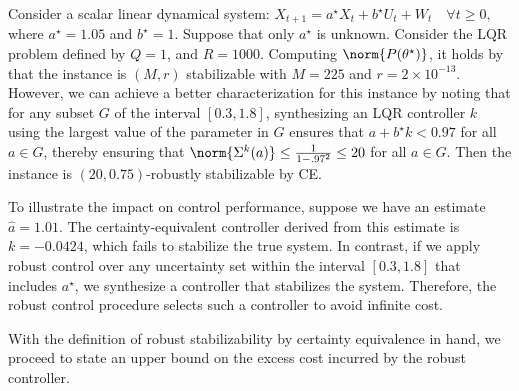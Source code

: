 \begin{example}
    Consider a scalar linear dynamical system:
        $X_{t+1} = a^\star X_t + b^\star U_t + W_t \quad \forall t\geq 0,$
    where $a^\star = 1.05$ and $b^\star = 1$. Suppose that only $a^\star$ is unknown. Consider the LQR problem defined by $Q=1$, and $R=1000$. Computing $\norm{P(\theta^\star)}$, it holds by \citet{simchowitz2020naive} that the instance is $(M, r)$ stabilizable with $M = 225$ and $r = 2\times 10^{-13}$. However, we can achieve a better characterization for this instance by noting that for any subset $G$ of the interval $[0.3, 1.8]$, synthesizing an LQR controller $k$ using the largest value of the parameter in $G$ ensures that $a + b^\star k < 0.97$ for all $a \in G$, thereby ensuring that $\norm{\Sigma^k(a)} \leq \frac{1}{1-.97^2}\leq 20$ for all $a \in G$. Then the instance is $(20, 0.75)$-robustly stabilizable by CE. 

    To illustrate the impact on control performance, suppose we have an estimate $\hat a = 1.01$. The certainty-equivalent controller derived from this estimate is $k=-0.0424$, which fails to stabilize the true system. In contrast, if we apply robust control over any uncertainty set within the interval 
    $[0.3,1.8]$ that includes $a^\star$, we synthesize a controller that stabilizes the system. Therefore, the robust control procedure selects such a controller to avoid infinite cost.
\end{example}

With the definition of robust stabilizability by certainty equivalence in hand, we proceed to state an upper bound on the excess cost incurred by the robust controller. 

